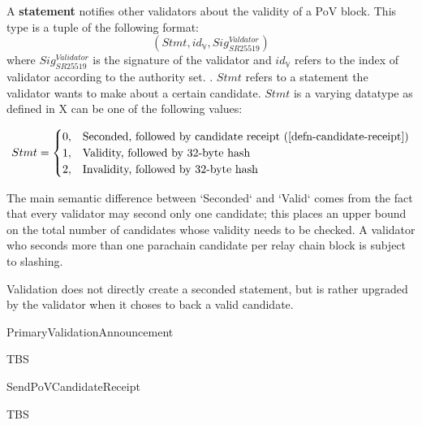 \begin{definition}
  \label{defn-gossip-statement}
  A \textbf{statement} notifies other validators about the validity of a PoV block.
  This type is a tuple of the following format:
  \[
  (Stmt, id_{\mathbb{V}}, Sig^{Valdator}_{SR25519})
  \]
  where $Sig^{Validator}_{SR25519}$ is the signature of the validator and
  $id_{\mathbb{V}}$ refers to the index of validator according to the authority
  set. . $Stmt$
  refers to a statement the validator wants to make about a certain candidate.
  $Stmt$ is a varying datatype as defined in X  can be one
  of the following values:

  \begin{equation}
    Stmt =
    \begin{cases}
      0, & \text{Seconded, followed by candidate receipt (\ref{defn-candidate-receipt})} \\
      1, & \text{Validity, followed by 32-byte hash} \\
      2, & \text{Invalidity, followed by 32-byte hash}
    \end{cases}
  \end{equation}
\end{definition}

The main semantic difference between `Seconded` and `Valid` comes from the fact
that every validator may second only one candidate; this places an upper bound
on the total number of candidates whose validity needs to be checked. A
validator who seconds more than one parachain candidate per relay chain block is
subject to slashing.
\newline

Validation does not directly create a seconded statement, but is rather upgraded
by the validator when it choses to back a valid candidate.

\begin{algorithm}
  \caption[PrimaryValidationAnnouncement]{\sc PrimaryValidationAnnouncement}
  \label{algo-primary-validation-announcement}
  \begin{algorithmic}[1]
    \Require{}
     \State TBS
  \end{algorithmic}
\end{algorithm}

\begin{algorithm}
  \caption[]{\sc SendPoVCandidateReceipt}
  \label{algo-send-candidate-receipt}
  \begin{algorithmic}[1]
    \Require{}

    \State TBS
  \end{algorithmic}
\end{algorithm}


